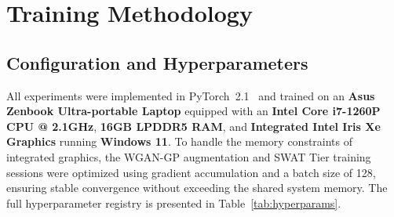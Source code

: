 \documentclass[conference]{IEEEtran}
\begin{document}
\section{Training Methodology}

\subsection{Configuration and Hyperparameters}
All experiments were implemented in PyTorch~2.1~\cite{b25} and trained
on an \textbf{Asus Zenbook Ultra-portable Laptop} equipped with an
\textbf{Intel Core i7-1260P CPU @ 2.1GHz}, \textbf{16GB LPDDR5 RAM}, and
\textbf{Integrated Intel Iris Xe Graphics} running \textbf{Windows 11}.
To handle the memory constraints of integrated graphics, the WGAN-GP
augmentation and SWAT Tier training sessions were optimized using
gradient accumulation and a batch size of 128, ensuring stable
convergence without exceeding the shared system memory. The full
hyperparameter registry is presented in Table~\ref{tab:hyperparams}.

\begin{table}[h]
\caption{Training Hyperparameter Registry (5-Class Hybrid)}
\label{tab:hyperparams}
\centering
{}
\end{table}
\end{document}
